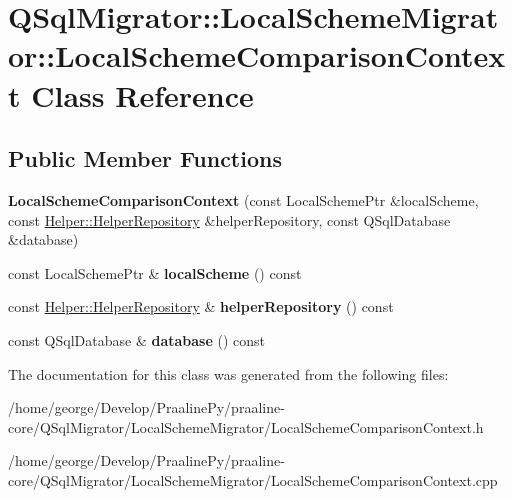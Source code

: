 \hypertarget{class_q_sql_migrator_1_1_local_scheme_migrator_1_1_local_scheme_comparison_context}{}\section{Q\+Sql\+Migrator\+:\+:Local\+Scheme\+Migrator\+:\+:Local\+Scheme\+Comparison\+Context Class Reference}
\label{class_q_sql_migrator_1_1_local_scheme_migrator_1_1_local_scheme_comparison_context}
\subsection*{Public Member Functions}
\begin{DoxyCompactItemize}
\item 
\mbox{\label{class_q_sql_migrator_1_1_local_scheme_migrator_1_1_local_scheme_comparison_context_ae5a042a542372af80cdd2c8a9aa7e424}} 
{\bfseries Local\+Scheme\+Comparison\+Context} (const Local\+Scheme\+Ptr \&local\+Scheme, const \hyperlink{class_q_sql_migrator_1_1_helper_1_1_helper_repository}{Helper\+::\+Helper\+Repository} \&helper\+Repository, const Q\+Sql\+Database \&database)
\item 
\mbox{\label{class_q_sql_migrator_1_1_local_scheme_migrator_1_1_local_scheme_comparison_context_a2588b89dcefbe62e59cc1d67f19b5e83}} 
const Local\+Scheme\+Ptr \& {\bfseries local\+Scheme} () const
\item 
\mbox{\label{class_q_sql_migrator_1_1_local_scheme_migrator_1_1_local_scheme_comparison_context_a97dcf7a7c8d9ec182b9419c7f4bcda01}} 
const \hyperlink{class_q_sql_migrator_1_1_helper_1_1_helper_repository}{Helper\+::\+Helper\+Repository} \& {\bfseries helper\+Repository} () const
\item 
\mbox{\label{class_q_sql_migrator_1_1_local_scheme_migrator_1_1_local_scheme_comparison_context_a7e3b308cd53366eb3f54614a405fb777}} 
const Q\+Sql\+Database \& {\bfseries database} () const
\end{DoxyCompactItemize}


The documentation for this class was generated from the following files\+:\begin{DoxyCompactItemize}
\item 
/home/george/\+Develop/\+Praaline\+Py/praaline-\/core/\+Q\+Sql\+Migrator/\+Local\+Scheme\+Migrator/Local\+Scheme\+Comparison\+Context.\+h\item 
/home/george/\+Develop/\+Praaline\+Py/praaline-\/core/\+Q\+Sql\+Migrator/\+Local\+Scheme\+Migrator/Local\+Scheme\+Comparison\+Context.\+cpp\end{DoxyCompactItemize}

